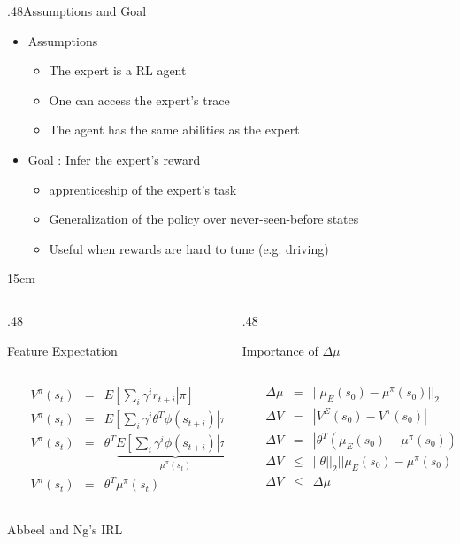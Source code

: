\documentclass[xcolor=x11names,12pt]{beamer}
\newcommand{\TwoBoxes}[7]{%
  \begin{columns}
    \begin{column}{#1\textwidth}
      \begin{block}{#2}
        \begin{columns}
          \begin{column}{0.001\textwidth}
            \vspace{#7}
          \end{column}
          \begin{column}{\textwidth}
            \centering
            #3
          \end{column}
        \end{columns}       
      \end{block}
    \end{column}
    
    \begin{column}{#4\textwidth}
      \begin{block}{#5}
        \begin{columns}
          \begin{column}{0.001\textwidth}
            \vspace{#7}
          \end{column}
          \begin{column}{\textwidth}
            \centering
            #6
          \end{column}
        \end{columns}       
      \end{block}
    \end{column}
  \end{columns}
}
\begin{document}
\begin{frame}
{\begin{columns}
\begin{column}{.48\textwidth}
    \end{column}
  \end{columns}
}
{.48}{Assumptions and Goal}{
  \begin{itemize}
  \item Assumptions
    \begin{itemize}
    \item The expert is a RL agent
    \item One can access the expert's trace
    \item The agent has the same abilities as the expert
    \end{itemize}
  \item Goal : Infer the expert's reward
    \begin{itemize}
    \item apprenticeship of the expert's task
    \item Generalization of the policy over never-seen-before states
    \item Useful when rewards are hard to tune (e.g. driving)
    \end{itemize}
  \end{itemize}
}
{15cm}
\vfill
\TwoBoxes{.48}{Feature Expectation}{
  \begin{eqnarray*}
    V^\pi(s_t) &=& E\left[\left.\sum\limits_{i}\gamma^i r_{t+i}\right|\pi\right]\\
    V^\pi(s_t) &=& E\left[\left.\sum\limits_{i}\gamma^i \theta^T\phi(s_{t+i})\right|\pi\right]\\
    V^\pi(s_t) &=& \theta^T\underbrace{E\left[\left.\sum\limits_{i}\gamma^i \phi(s_{t+i})\right|\pi\right]}_{\mu^\pi(s_t)}\\
    V^\pi(s_t) &=& \theta^T\mu^\pi(s_t)
  \end{eqnarray*}
}{.48}{Importance of $\Delta \mu$}{
  \begin{eqnarray*}
    \Delta\mu &=& ||\mu_E(s_0) - \mu^\pi(s_0)||_2\\
    \Delta V &=& |V^E(s_0) - V^\pi(s_0)|\\
    \Delta V &=& |\theta^T\left(\mu_E(s_0) - \mu^\pi(s_0)\right)|\\
    \Delta V &\leq& ||\theta||_2||\mu_E(s_0) - \mu^\pi(s_0)||_2\\
    \Delta V &\leq& \Delta\mu\\
  \end{eqnarray*}
}
{15cm}
\vfill
  \begin{columns}
    \begin{column}{.48\textwidth}
    \begin{block}{Abbeel and Ng's IRL}
      \begin{columns}
        \begin{column}{0.001\textwidth}
          \vspace{8cm}
        \end{column}
        \begin{column}{\textwidth}
          \centering


\end{column}
\end{columns}
\end{block}
\end{column}
\end{columns}
\end{frame}
\end{document}
